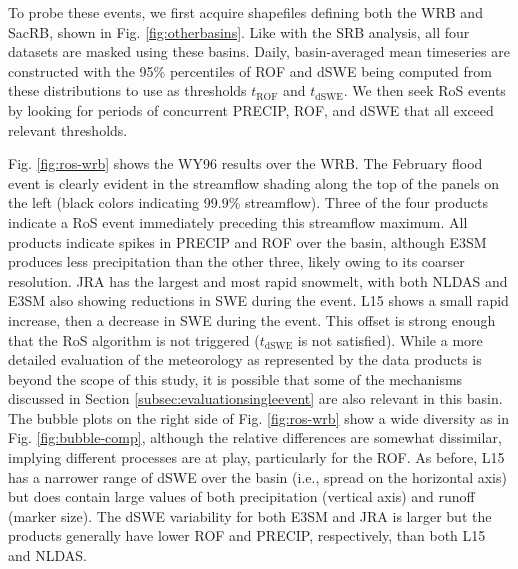 \documentclass[nhess, manuscript]{copernicus}
\begin{document}
To probe these events, we first acquire shapefiles defining both the WRB and SacRB, shown in Fig. \ref{fig:otherbasins}.
Like with the SRB analysis, all four datasets are masked using these basins.
Daily, basin-averaged mean timeseries are constructed with the 95\% percentiles of ROF and dSWE being computed from these distributions to use as thresholds $t_{\textrm{ROF}}$ and $t_{\textrm{dSWE}}$.
We then seek RoS events by looking for periods of concurrent PRECIP, ROF, and dSWE that all exceed relevant thresholds.

Fig. \ref{fig:ros-wrb} shows the WY96 results over the WRB. The February flood event is clearly evident in the streamflow shading along the top of the panels on the left (black colors indicating 99.9\% streamflow).
Three of the four products indicate a RoS event immediately preceding this streamflow maximum.
All products indicate spikes in PRECIP and ROF over the basin, although E3SM produces less precipitation than the other three, likely owing to its coarser resolution.
JRA has the largest and most rapid snowmelt, with both NLDAS and E3SM also showing reductions in SWE during the event.
L15 shows a small rapid increase, then a decrease in SWE during the event.
This offset is strong enough that the RoS algorithm is not triggered ($t_{\textrm{dSWE}}$ is not satisfied).
While a more detailed evaluation of the meteorology as represented by the data products is beyond the scope of this study, it is possible that some of the mechanisms discussed in Section \ref{subsec:evaluationsingleevent} are also relevant in this basin.
The bubble plots on the right side of Fig. \ref{fig:ros-wrb} show a wide diversity as in Fig. \ref{fig:bubble-comp}, although the relative differences are somewhat dissimilar, implying different processes are at play, particularly for the ROF.
As before, L15 has a narrower range of dSWE over the basin (i.e., spread on the horizontal axis) but does contain large values of both precipitation (vertical axis) and runoff (marker size).
The dSWE variability for both E3SM and JRA is larger but the products generally have lower ROF and PRECIP, respectively, than both L15 and NLDAS.
\end{document}
